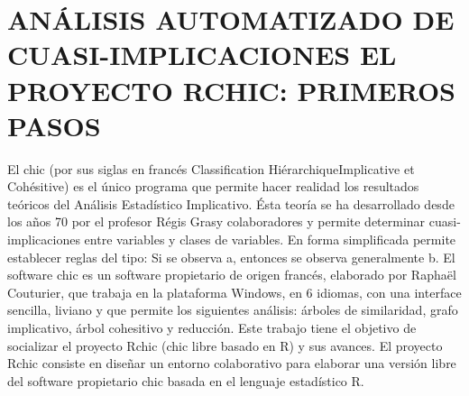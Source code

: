 \chapter{ANÁLISIS AUTOMATIZADO DE CUASI-IMPLICACIONES EL PROYECTO RCHIC: PRIMEROS PASOS}




El chic (por sus siglas en francés Classification HiérarchiqueImplicative et Cohésitive) es el único programa que permite hacer realidad los resultados teóricos del Análisis Estadístico Implicativo. Ésta teoría se ha desarrollado desde los años 70 por el profesor Régis Grasy colaboradores y permite determinar cuasi-implicaciones entre variables y clases de variables. En forma simplificada permite establecer reglas del tipo: Si se observa a, entonces se observa generalmente b. El software chic es un software propietario de origen francés, elaborado por Raphaël Couturier, que trabaja en la plataforma Windows, en 6 idiomas, con una interface sencilla, liviano y que permite los siguientes análisis: árboles de similaridad, grafo implicativo, árbol cohesitivo y reducción. Este trabajo tiene el objetivo de socializar el proyecto Rchic (chic libre basado en R) y sus avances. El proyecto Rchic consiste en diseñar un entorno colaborativo para elaborar una versión libre del software propietario chic basada en el lenguaje estadístico R. 

%

%
